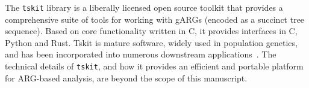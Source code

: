 \documentclass[9pt,twocolumn,twoside]{gsajnl}
\begin{document}
The \texttt{tskit} library is a liberally
licensed open source toolkit that provides a comprehensive suite
of tools for working with gARGs (encoded as a succinct tree sequence).
Based on core functionality written
in C, it provides interfaces in C, Python and Rust.
Tskit is mature software, widely used in population genetics, and
has been incorporated into numerous downstream
applications~\citep[e.g.,][]{haller2019slim,speidel2019method,
adrion2020community,
terasaki2021geonomics,
baumdicker2021efficient,
fan2022genealogical,
guo2022recombination,
korfmann2022weak,
mahmoudi2022bayesian,
petr2023slendr,
rasmussen2022espalier,
zhang2023biobank,
nowbandegani2023extremely,
ignatieva2023distribution,
fan2023likelihood,
tsambos2023link,
tagami2024tstrait,
korfmann2024simultaneous}.
The technical details of \texttt{tskit}, and how it provides an
efficient and portable platform for ARG-based analysis, are beyond
the scope of this manuscript.
\end{document}
